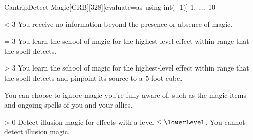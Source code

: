 
\begin{card-collection}{Cantrip}{\level}{Detect Magic}[CRB][328]{[evaluate=\level as \lowerLevel using int(\level - 1)] \level}{1, ..., 10}





\ifnum \level < 3
  You receive no information beyond the presence or absence of magic.
\fi

\ifnum \level = 3
  You learn the school of magic for the highest-level effect within range that the spell detects.
\fi

\ifnum \level > 3
  You learn the school of magic for the highest-level effect within range that the spell detects and pinpoint its source to a 5-foot cube.
\fi

You can choose to ignore magic you're fully aware of, such as the magic items and ongoing spells of you and your allies.

\ifnum \lowerLevel > 0
Detect illusion magic for effects with a level \(\le \lowerLevel\).
\else
You cannot detect illusion magic.
\fi
\end{card-collection}%
